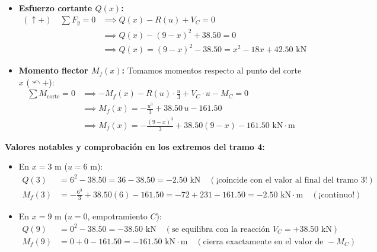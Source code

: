 \begin{itemize}
    \item \textbf{Esfuerzo cortante $Q(x)$:}
    \begin{align}
        (\uparrow +) \quad \sum F_y = 0 &\implies Q(x) - R(u) + V_C = 0 \nonumber \\
        &\implies Q(x) - (9 - x)^2 + 38.50 = 0 \nonumber \\
        &\implies \boxed{Q(x) = (9 - x)^2 - 38.50 = x^2 - 18x + 42.50\text{ kN}}
    \end{align}
    \item \textbf{Momento flector $M_f(x)$:}
    Tomamos momentos respecto al punto del corte $x$ ($\curvearrowleft +$):
    \begin{align}
        \sum M_{\text{corte}} = 0 &\implies -M_f(x) - R(u) \cdot \frac{u}{3} + V_C \cdot u - M_C = 0 \nonumber \\
        &\implies M_f(x) = -\frac{u^3}{3} + 38.50\,u - 161.50 \nonumber \\
        &\implies \boxed{M_f(x) = -\frac{(9 - x)^3}{3} + 38.50(9 - x) - 161.50\text{ kN}\cdot\text{m}}
    \end{align}
\end{itemize}

\textbf{Valores notables y comprobación en los extremos del tramo 4:}
\begin{itemize}
    \item En $x = 3\text{ m}$ ($u = 6\text{ m}$):
    \begin{align*}
        Q(3) &= 6^2 - 38.50 = 36 - 38.50 = -2.50\text{ kN} \quad (\text{¡coincide con el valor al final del tramo 3!}) \\
        M_f(3) &= -\frac{6^3}{3} + 38.50(6) - 161.50 = -72 + 231 - 161.50 = -2.50\text{ kN}\cdot\text{m} \quad (\text{¡continuo!})
    \end{align*}
    \item En $x = 9\text{ m}$ ($u = 0$, empotramiento $C$):
    \begin{align*}
        Q(9) &= 0^2 - 38.50 = -38.50\text{ kN} \quad (\text{se equilibra con la reacción } V_C = +38.50\text{ kN}) \\
        M_f(9) &= 0 + 0 - 161.50 = -161.50\text{ kN}\cdot\text{m} \quad (\text{cierra exactamente en el valor de } -M_C)
    \end{align*}
\end{itemize}


